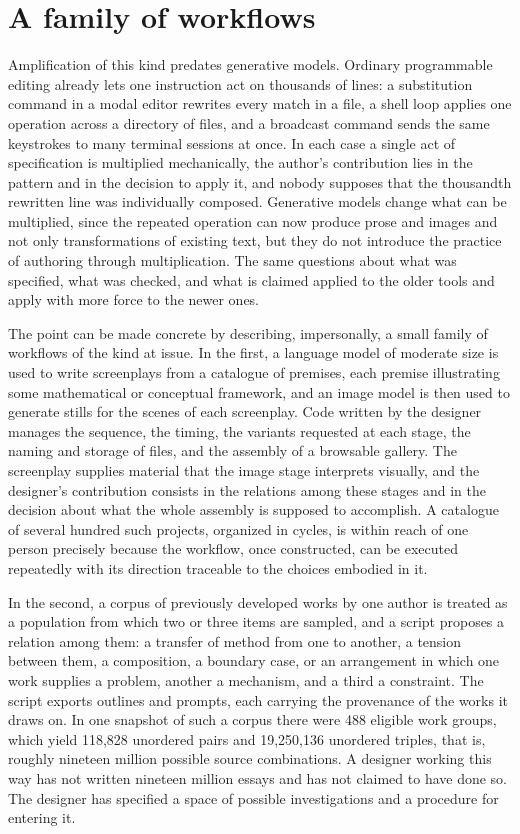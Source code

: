 \documentclass[12pt]{article}
\begin{document}
\section{A family of workflows}

Amplification of this kind predates generative models. Ordinary programmable editing already lets one instruction act on thousands of lines: a substitution command in a modal editor rewrites every match in a file, a shell loop applies one operation across a directory of files, and a broadcast command sends the same keystrokes to many terminal sessions at once. In each case a single act of specification is multiplied mechanically, the author's contribution lies in the pattern and in the decision to apply it, and nobody supposes that the thousandth rewritten line was individually composed. Generative models change what can be multiplied, since the repeated operation can now produce prose and images and not only transformations of existing text, but they do not introduce the practice of authoring through multiplication. The same questions about what was specified, what was checked, and what is claimed applied to the older tools and apply with more force to the newer ones.

The point can be made concrete by describing, impersonally, a small family of workflows of the kind at issue. In the first, a language model of moderate size is used to write screenplays from a catalogue of premises, each premise illustrating some mathematical or conceptual framework, and an image model is then used to generate stills for the scenes of each screenplay. Code written by the designer manages the sequence, the timing, the variants requested at each stage, the naming and storage of files, and the assembly of a browsable gallery. The screenplay supplies material that the image stage interprets visually, and the designer's contribution consists in the relations among these stages and in the decision about what the whole assembly is supposed to accomplish. A catalogue of several hundred such projects, organized in cycles, is within reach of one person precisely because the workflow, once constructed, can be executed repeatedly with its direction traceable to the choices embodied in it.

In the second, a corpus of previously developed works by one author is treated as a population from which two or three items are sampled, and a script proposes a relation among them: a transfer of method from one to another, a tension between them, a composition, a boundary case, or an arrangement in which one work supplies a problem, another a mechanism, and a third a constraint. The script exports outlines and prompts, each carrying the provenance of the works it draws on. In one snapshot of such a corpus there were 488 eligible work groups, which yield 118,828 unordered pairs and 19,250,136 unordered triples, that is, roughly nineteen million possible source combinations. A designer working this way has not written nineteen million essays and has not claimed to have done so. The designer has specified a space of possible investigations and a procedure for entering it.
\end{document}
